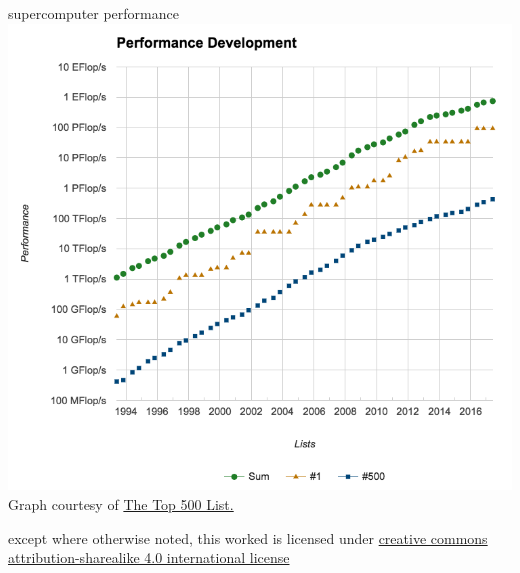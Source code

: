 \documentclass[10pt, t]{beamer}
\begin{document}
  \begin{frame}{supercomputer performance}
    \centering
    \includegraphics[width=.7\textwidth]{top500.png}\\
    \hfill \tiny{Graph courtesy of \href{https://www.top500.org/statistics/perfdevel/}{The Top 500 List.}\hspace{.15\textwidth}}

  \end{frame}

  \appendix

  \begin{frame}[c]
    \begin{center}\ccbysa\end{center}

    except where otherwise noted, this worked is licensed under
    \href{http://creativecommons.org/licenses/by-sa/4.0/}{creative commons
    attribution-sharealike 4.0 international license}
  \end{frame}
\end{document}
